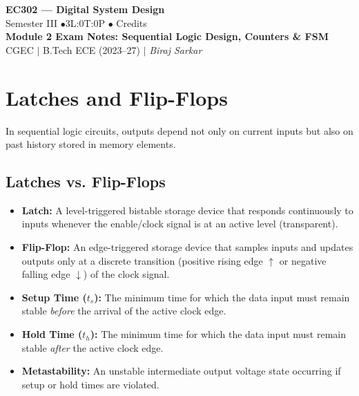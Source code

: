 \documentclass[12pt,a4paper]{article}
\begin{document}
\begin{center}
  {\LARGE\bfseries\color{myred} EC302 --- Digital System Design}\\[5pt]
  {\normalsize\color{mydark} Semester III \quad$\bullet$\quad 3L:0T:0P \quad$\bullet$ Credits}\\[3pt]
  {\normalsize\color{myteal}\textbf{Module 2 Exam Notes: Sequential Logic Design, Counters \& FSM}}\\[3pt]
  {\small\color{mydark} CGEC \;$|$\; B.Tech ECE (2023--27) \;$|$\; \textit{Biraj Sarkar}}
\end{center}
\vspace{2pt}
\noindent{\color{myred}\rule{\linewidth}{1.5pt}}
\vspace{2pt}

\hypersetup{linkcolor=mydark}
\tableofcontents
\hypersetup{linkcolor=myteal}
\newpage

\section{Latches and Flip-Flops}

In sequential logic circuits, outputs depend not only on current inputs but also on past history stored in memory elements.

\subsection{Latches vs. Flip-Flops}
\begin{itemize}[leftmargin=*, itemsep=3pt]
  \item \textbf{Latch:} A level-triggered bistable storage device that responds continuously to inputs whenever the enable/clock signal is at an active level (transparent).
  \item \textbf{Flip-Flop:} An edge-triggered storage device that samples inputs and updates outputs only at a discrete transition (positive rising edge $\uparrow$ or negative falling edge $\downarrow$) of the clock signal.
  \item \textbf{Setup Time ($t_s$):} The minimum time for which the data input must remain stable \textit{before} the arrival of the active clock edge.
  \item \textbf{Hold Time ($t_h$):} The minimum time for which the data input must remain stable \textit{after} the active clock edge.
  \item \textbf{Metastability:} An unstable intermediate output voltage state occurring if setup or hold times are violated.
\end{itemize}
\end{document}
